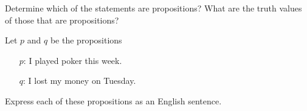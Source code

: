 \documentclass[12pt]{exam}
\newenvironment{my_parts}{
\begin{parts}
    \setlength{\itemsep}{1pt}
    \setlength{\parskip}{0pt}
    \setlength{\parsep}{0pt}
}{\end{parts}}
\begin{document}
\begin{questions}
\printanswers

\question[8] Determine which of the statements are propositions? What are the truth values of those that are propositions?
    \begin{solution}
    \end{solution}

\question[8] Let $p$ and $q$ be the propositions
 \begin{itemize}
    \item[$p$:] I played poker this week.
    \item[$q$:] I lost my money on Tuesday.
 \end{itemize}
 Express each of these propositions as an English sentence.
    \begin{my_parts}

\end{my_parts}
\end{questions}
\end{document}

